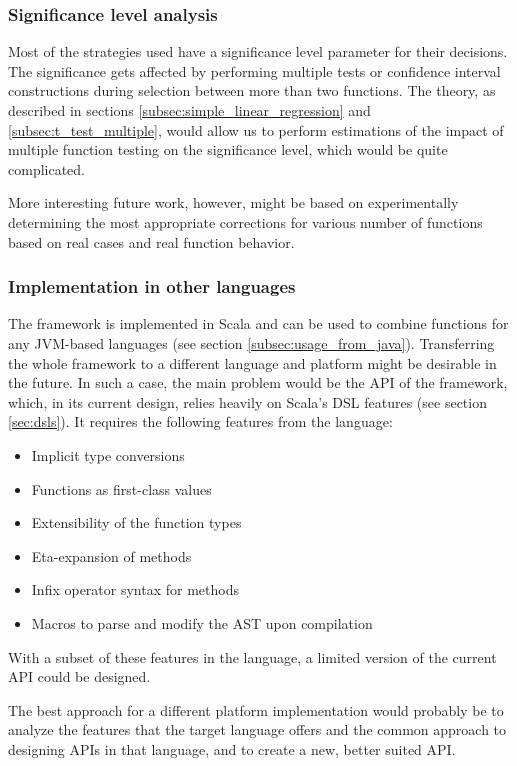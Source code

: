 \subsubsection{Significance level analysis}

Most of the strategies used have a significance level parameter for their decisions. The significance gets affected by performing multiple tests or confidence interval constructions during selection between more than two functions. The theory, as described in sections \ref{subsec:simple_linear_regression} and \ref{subsec:t_test_multiple}, would allow us to perform estimations of the impact of multiple function testing on the significance level, which would be quite complicated. 

More interesting future work, however, might be based on experimentally determining the most appropriate corrections for various number of functions based on real cases and real function behavior.

\subsubsection{Implementation in other languages}

The framework is implemented in Scala and can be used to combine functions for any JVM-based languages (see section \ref{subsec:usage_from_java}). Transferring the whole framework to a different language and platform might be desirable in the future. In such a case, the main problem would be the API of the framework, which, in its current design, relies heavily on Scala's DSL features (see section \ref{sec:dsls}). It requires the following features from the language:

\begin{itemize}
	\item Implicit type conversions
	\item Functions as first-class values
	\item Extensibility of the function types
	\item Eta-expansion of methods
	\item Infix operator syntax for methods
	\item Macros to parse and modify the AST upon compilation
\end{itemize}

With a subset of these features in the language, a limited version of the current API could be designed. 

The best approach for a different platform implementation would probably be to analyze the features that the target language offers and the common approach to designing APIs in that language, and to create a new, better suited API.